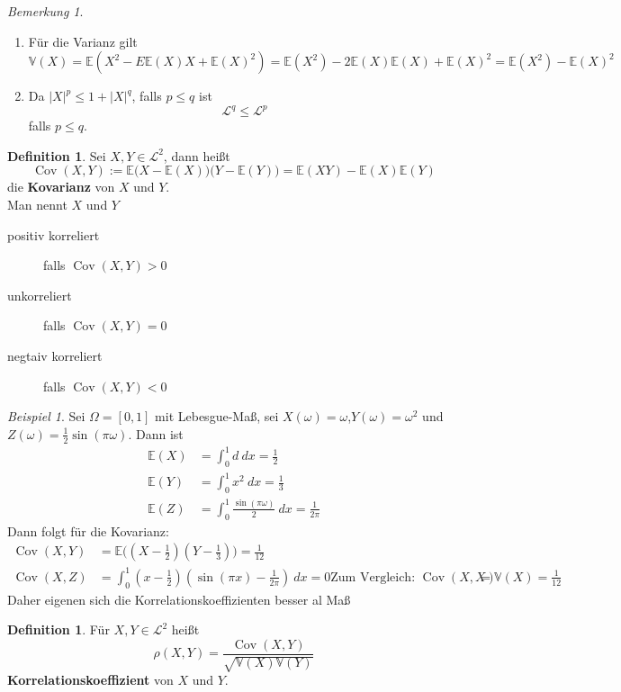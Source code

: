 \documentclass[10pt,a4paper]{article}
\newcommand{\Epv}{\ensuremath{\mathbb{E}}}
\newcommand{\Var}{\mathbb{V}}
\newcommand{\Cov}{\operatorname{Cov}}
\newcommand{\Kor}{\rho}
\newcommand{\scL}{\mathscr L}
\theoremstyle{plain}
\theoremstyle{definition}
\newtheorem{definition}[theorem]{Definition}
\theoremstyle{remark}
\newtheorem{bem}[theorem]{Bemerkung}
\newtheorem{exm}[theorem]{Beispiel}
\begin{document}
	\begin{bem}
		\begin{enumerate}
			\item Für die Varianz gilt \[\Var(X)=\Epv(X^2-E\Epv(X)X+\Epv(X)^2)=\Epv(X^2)-2\Epv(X)\Epv(X)+\Epv(X)^2=\Epv(X^2)-\Epv(X)^2\]
			\item Da $|X|^p\leq 1+|X|^q$, falls $p\leq q$ ist
			\[\scL^q\leq \scL^p\]
			falls $p\leq q$.
		\end{enumerate}
	\end{bem}

	\begin{definition}
		Sei $X,Y\in\scL^2$, dann heißt \[\Cov(X,Y):=\Epv\big(X-\Epv(X)\big)\big(Y-\Epv(Y)\big)=\Epv(XY)-\Epv(X)\Epv(Y)\]
		die \textbf{Kovarianz} von $X$ und $Y$.\\
		Man nennt $X$ und $Y$
		\begin{description}
			\item[positiv korreliert] falls $\Cov(X,Y)>0$
			\item[unkorreliert] falls $\Cov(X,Y)=0$
			\item[negtaiv korreliert] falls $\Cov(X,Y)<0$
		\end{description}
	\end{definition}

	\begin{exm}\label{0425exm}
		Sei $\Omega=[0,1]$ mit Lebesgue-Maß, sei $X(\omega)=\omega$,$Y(\omega)=\omega^2$ und $Z(\omega)=\frac{1}{2}\sin(\pi\omega)$.
		Dann ist
		\begin{align*}
		\Epv(X)&=\int_{0}^{1}d~dx=\frac{1}{2}\\
		\Epv(Y)&=\int_{0}^{1}x^2~dx=\frac{1}{3}\\
		\Epv(Z)&=\int_{0}^{1}\frac{\sin(\pi\omega)}{2}~dx=\frac{1}{2\pi}
		\end{align*}
		Dann folgt für die Kovarianz:
		\begin{align*}
		\Cov(X,Y)&=\Epv\big(\left(X-\frac{1}{2}\right)\left(Y-\frac{1}{3}\right)\big)=\frac{1}{12}\\
		\Cov(X,Z)&=\int_{0}^{1}\left(x-\frac{1}{2}\right)\left(\sin(\pi x)-\frac{1}{2\pi}\right)~dx=0
		\text{Zum Vergleich: }\Cov(X,X)&=\Var(X)=\frac{1}{12}
		\end{align*}
		Daher eigenen sich die Korrelationskoeffizienten besser al Maß
	\end{exm}

	\begin{definition}
		Für $X,Y\in\scL^2$ heißt\[\Kor(X,Y)=\frac{\Cov(X,Y)}{\sqrt{\Var(X)\Var(Y)}}\]
		\textbf{Korrelationskoeffizient} von $X$ und $Y$.
	\end{definition}
\end{document}
